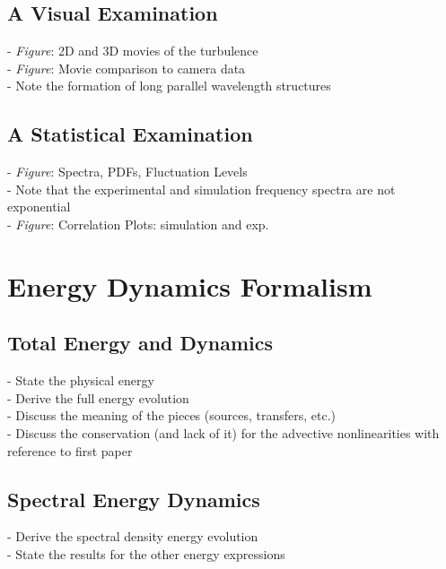 \documentclass[12pt]{article}
\begin{document}
\subsection{A Visual Examination}

- \emph{Figure}: 2D and 3D movies of the turbulence \\
- \emph{Figure}: Movie comparison to camera data \\
- Note the formation of long parallel wavelength structures \\

\subsection{A Statistical Examination}

- \emph{Figure}: Spectra, PDFs, Fluctuation Levels \\
- Note that the experimental and simulation frequency spectra are not exponential \\
- \emph{Figure}: Correlation Plots: simulation and exp. \\


\section{Energy Dynamics Formalism}

\subsection{Total Energy and Dynamics}

- State the physical energy \\
- Derive the full energy evolution \\
- Discuss the meaning of the pieces (sources, transfers, etc.) \\
- Discuss the conservation (and lack of it) for the advective nonlinearities with reference to first paper \\

\subsection{Spectral Energy Dynamics}

- Derive the spectral density energy evolution \\
- State the results for the other energy expressions \\

\end{document}
